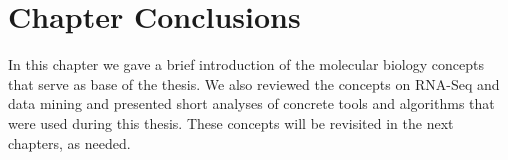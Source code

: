 \section{Chapter Conclusions}

In this chapter we gave a brief introduction of the molecular biology concepts
that serve as base of the thesis. We also reviewed the concepts on RNA-Seq and
data mining and presented short analyses of concrete tools and algorithms that
were used during this thesis. These concepts will be revisited in the next
chapters, as needed.
